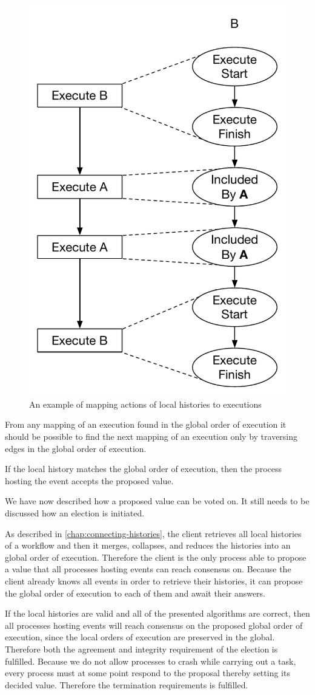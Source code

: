 	\begin{figure}[H]
		\centering
		\includegraphics[width=.4\textwidth]{5orderofexecution/images/election-mapping.pdf}
		\caption{An example of mapping actions of local histories to executions}
		\label{fig:orderofexecution:localmapping}
	\end{figure}
	
	\newpar From any mapping of an execution found in the global order of execution it should be possible to find the next mapping of an execution only by traversing edges in the global order of execution.
	
	If the local history matches the global order of execution, then the process hosting the event accepts the proposed value.
	
	\newpar We have now described how a proposed value can be voted on. It still needs to be discussed how an election is initiated.
	
	\newpar As described in \autoref{chap:connecting-histories}, the client retrieves all local histories of a workflow and then it merges, collapses, and reduces the histories into an global order of execution. Therefore the client is the only process able to propose a value that all processes hosting events can reach consensus on. Because the client already knows all events in order to retrieve their histories, it can propose the global order of execution to each of them and await their answers.
	
	\newpar If the local histories are valid and all of the presented algorithms are correct, then all processes hosting events will reach consensus on the proposed global order of execution, since the local orders of execution are preserved in the global. Therefore both the agreement and integrity requirement of the election is fulfilled. Because we do not allow processes to crash while carrying out a task, every process must at some point respond to the proposal thereby setting its decided value. Therefore the termination requirements is fulfilled.
	
